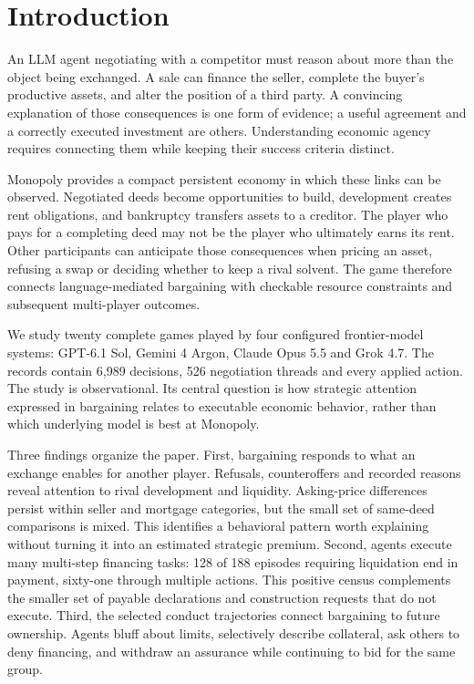 \section{Introduction}

An LLM agent negotiating with a competitor must reason about more than the object being exchanged. A sale can finance the seller, complete the buyer's productive assets, and alter the position of a third party. A convincing explanation of those consequences is one form of evidence; a useful agreement and a correctly executed investment are others. Understanding economic agency requires connecting them while keeping their success criteria distinct.

Monopoly provides a compact persistent economy in which these links can be observed. Negotiated deeds become opportunities to build, development creates rent obligations, and bankruptcy transfers assets to a creditor. The player who pays for a completing deed may not be the player who ultimately earns its rent. Other participants can anticipate those consequences when pricing an asset, refusing a swap or deciding whether to keep a rival solvent. The game therefore connects language-mediated bargaining with checkable resource constraints and subsequent multi-player outcomes.

We study twenty complete games played by four configured frontier-model systems: GPT-6.1 Sol, Gemini 4 Argon, Claude Opus 5.5 and Grok 4.7. The records contain 6,989 decisions, 526 negotiation threads and every applied action. The study is observational. Its central question is how strategic attention expressed in bargaining relates to executable economic behavior, rather than which underlying model is best at Monopoly.

Three findings organize the paper. First, bargaining responds to what an exchange enables for another player. Refusals, counteroffers and recorded reasons reveal attention to rival development and liquidity. Asking-price differences persist within seller and mortgage categories, but the small set of same-deed comparisons is mixed. This identifies a behavioral pattern worth explaining without turning it into an estimated strategic premium. Second, agents execute many multi-step financing tasks: 128 of 188 episodes requiring liquidation end in payment, sixty-one through multiple actions. This positive census complements the smaller set of payable declarations and construction requests that do not execute. Third, the selected conduct trajectories connect bargaining to future ownership. Agents bluff about limits, selectively describe collateral, ask others to deny financing, and withdraw an assurance while continuing to bid for the same group.

